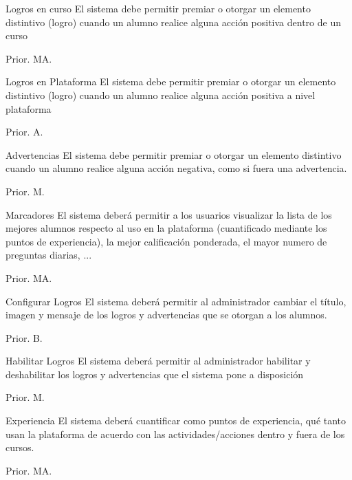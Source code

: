 
\clearpage

\begin{RF}{Logros en curso}{%
    El sistema debe permitir premiar o otorgar un elemento distintivo (logro) cuando un alumno realice alguna acción positiva dentro de un curso}
    \item[] Prior. MA. %
\end{RF}

\begin{RF}{Logros en Plataforma}{%
    El sistema debe permitir premiar o otorgar un elemento distintivo (logro) cuando un alumno realice alguna acción positiva a nivel plataforma}
    \item[] Prior. A. %
\end{RF}

\begin{RF}{Advertencias}{%
    El sistema debe permitir premiar o otorgar un elemento distintivo cuando un alumno realice alguna acción negativa, como si fuera una advertencia.}
    \item[] Prior. M. %
\end{RF}

\begin{RF}{Marcadores}{%
    El sistema deberá permitir a los usuarios visualizar la lista de los mejores alumnos respecto al uso en la plataforma (cuantificado mediante los puntos de experiencia), la mejor calificación ponderada, el mayor numero de preguntas diarias, ...}
    \item[] Prior. MA. %
\end{RF}

\begin{RF}{Configurar Logros}{%
    El sistema deberá permitir al administrador cambiar el título, imagen y mensaje de los logros y advertencias que se otorgan a los alumnos.}
    \item[] Prior. B. %
\end{RF}

\begin{RF}{Habilitar Logros}{%
    El sistema deberá permitir al administrador habilitar y deshabilitar los logros y advertencias que el sistema pone a disposición}
    \item[] Prior. M. %
\end{RF}

\begin{RF}{Experiencia}{%
    El sistema deberá cuantificar como puntos de experiencia, qué tanto usan la plataforma de acuerdo con las actividades/acciones dentro y fuera de los cursos. }
    \item[] Prior. MA. %
\end{RF}

